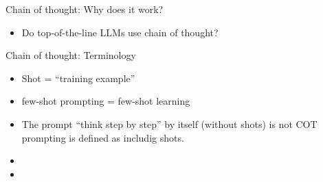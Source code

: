\begin{frame}{Chain of thought: Why does it work?}

\vfill

\begin{itemize}
    \item \ques Do top-of-the-line LLMs use chain of thought?
\end{itemize}

\vfill

\end{frame}

\begin{frame}{Chain of thought: Terminology}

\vfill

\begin{itemize}
    \item Shot = ``training example''
    \item few-shot prompting = few-shot learning
    \item The prompt ``think step by step'' by itself
    (without shots) is not
    COT prompting is defined as includig shots.
    \item 
    \item 
\end{itemize}

\vfill

\end{frame}



\endlecture

